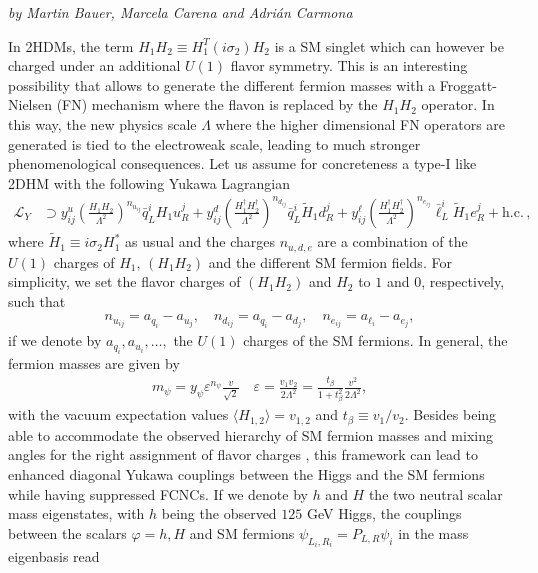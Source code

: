 
\begin{left}
\textit{by Martin Bauer, Marcela Carena and Adri\'an Carmona}
\end{left}

In 2HDMs, the term $H_1 H_2\equiv H_1^T (i\sigma_2) H_2 $ is a SM singlet which can however be charged under an additional $U(1)$ flavor symmetry. This is an interesting possibility that allows to generate the different fermion masses with a Froggatt-Nielsen (FN) mechanism where the flavon is replaced by the $H_1 H_2$ operator. In this way, the new physics scale $\Lambda$ where the higher dimensional FN operators are generated is tied to the electroweak scale, leading to much stronger phenomenological consequences. Let us assume for concreteness a type-I like 2DHM with the following Yukawa Lagrangian 
\begin{align}
\label{eq:yuk1}
\mathcal{L}_Y&\supset  y^u_{ij} \left(\frac{H_1 H_2}{\Lambda^2}\right)^{n_{u_{ij}}}\bar{q}_L^{i}H_1 u_{R}^j+y^d_{ij} \left(\frac{H_1^{\dagger} H_2^{\dagger}}{\Lambda^2}\right)^{n_{d_{ij}}}\bar{q}_L^{i}\tilde{H}_1 d_{R}^j+y_{ij}^{\ell}\left(\frac{H_1^{\dagger}H_2^{\dagger}}{\Lambda^2}\right)^{n_{e_{ij}}}\bar{\ell}_{L}^i\tilde{H}_1 e_R^j
+\mathrm{h.c.}\,,
\end{align}
where $\tilde{H}_1\equiv i\sigma_2 H^{\ast}_1$ as usual and the charges $n_{u,d,e}$ are a combination of the $U(1)$ charges of $H_1$, $(H_1H_2)$ and the different SM fermion fields. For simplicity, we set the flavor charges of $(H_1 H_2)$ and $H_2$ to $1$ and $0$, respectively, such that  
\begin{align}
n_{u_{ij}}=a_{q_i}-a_{u_j},\quad n_{d_{ij}}=a_{q_i}-a_{d_j},\quad n_{e_{ij}}=a_{\ell_i}-a_{e_j},
\end{align}
if we denote by $a_{q_i},a_{u_i}, \ldots,$ the $U(1)$ charges of the SM fermions. In general, the fermion masses are given by
\begin{align}\label{eq:epsilon}
m_\psi=y_{\psi} \varepsilon^{n_\psi} \frac{v}{\sqrt{2}} \quad \varepsilon = \frac{v_1 v_2}{2\Lambda^2}=\frac{t_\beta}{1+t_\beta^2}\frac{v^2}{2\Lambda^2},
\end{align}
with the vacuum expectation values $\langle H_{1, 2}\rangle=v_{1, 2}$ and $t_\beta \equiv v_1/v_2$. Besides being able to accommodate the observed hierarchy of SM fermion masses and mixing angles for the right assignment of flavor charges \cite{}, this framework can lead to enhanced diagonal Yukawa couplings between the Higgs and the SM fermions while having suppressed FCNCs. If we denote by $h$ and $H$ the two neutral scalar mass eigenstates, with $h$ being the observed $125$ GeV Higgs, the couplings between the scalars $\varphi=h,H$ and SM fermions $\psi_{L_i, R_i}= P_{L,R} \psi_i$ in the mass eigenbasis read 
